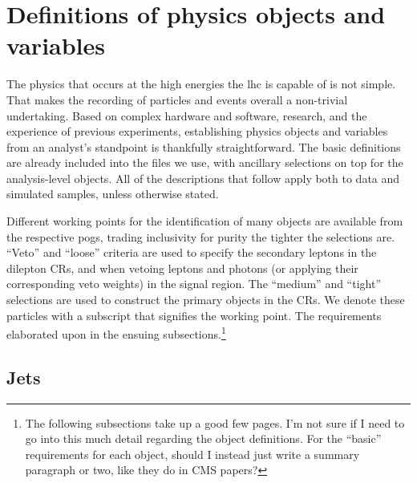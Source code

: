 



\section{Definitions of physics objects and variables}
\label{sec:htoinv_objects}

The physics that occurs at the high energies the \acrshort{lhc} is capable of is not simple. That makes the recording of particles and events overall a non-trivial undertaking. Based on complex hardware and software, research, and the experience of previous experiments, establishing physics objects and variables from an analyst's standpoint is thankfully straightforward. The basic definitions are already included into the \ROOT files we use, with ancillary selections on top for the analysis-level objects. All of the descriptions that follow apply both to data and simulated samples, unless otherwise stated.

Different working points for the identification of many objects are available from the respective \glspl{pog}, trading inclusivity for purity the tighter the selections are. ``Veto'' and ``loose'' criteria are used to specify the secondary leptons in the dilepton \glspl{CR}, and when vetoing leptons and photons (or applying their corresponding veto weights) in the signal region. The ``medium'' and ``tight'' selections are used to construct the primary objects in the \glspl{CR}. We denote these particles with a subscript that signifies the working point. The requirements elaborated upon in the ensuing subsections.\footnote{The following subsections take up a good few pages. I'm not sure if I need to go into this much detail regarding the object definitions. For the ``basic'' requirements for each object, should I instead just write a summary paragraph or two, like they do in CMS papers?}




\subsection{Jets}
\label{subsec:htoinv_jet_objs}

